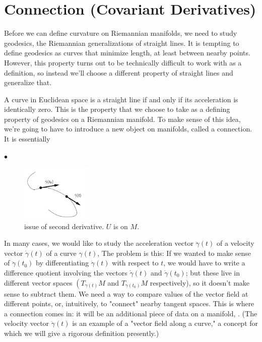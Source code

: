 \documentclass[12pt]{article} %
\begin{document}
\section{Connection (Covariant Derivatives)}
Before we can define curvature on Riemannian manifolds, we need to study geodesics, the Riemannian generalizations of straight lines. It is tempting to deﬁne geodesics as curves that minimize length, at least between nearby points. However, this property turns out to be technically difficult to work with as a definition, so instead we’ll choose a different property of straight lines and generalize that.

A curve in Euclidean space is a straight line if and only if its acceleration is identically zero. This is the property that we choose to take as a defining property of geodesics on a Riemannian manifold. To make sense of this idea, we’re going to have to introduce a new object on manifolds, called a connection. It is essentially 

$\bullet$ 
    \begin{figure}[ht]
    \centering
    \includegraphics[width=0.3\textwidth]{Figs/2.png}
    \caption{issue of second derivative. $U$ is on $M$.}
\end{figure}
In many cases, we would like to study the acceleration vector $\ddot{\gamma}(t)$ of a velocity vector $\dot{\gamma}(t)$ of a curve $\gamma(t)$, 
The problem is this: If we wanted to make sense of $\ddot{\gamma}\left(t_{0}\right)$ by differentiating $\dot{\gamma}(t)$ with respect to $t$, we would have to write a difference quotient involving the vectors $\dot{\gamma}(t)$ and $\dot{\gamma}\left(t_{0}\right)$; but these live in different vector spaces $\left(T_{\gamma(t)} M\right.$ and $T_{\gamma\left(t_{0}\right)} M$ respectively), so it doesn't make sense to subtract them. We need a way to compare values of the vector field at different points, or, intuitively, to "connect" nearby tangent spaces. This is where a connection comes in: it will be an additional piece of data on a manifold, . (The velocity vector $\dot{\gamma}(t)$ is an example of a "vector field along a curve," a concept for which we will give a rigorous definition presently.) 
\end{document}
